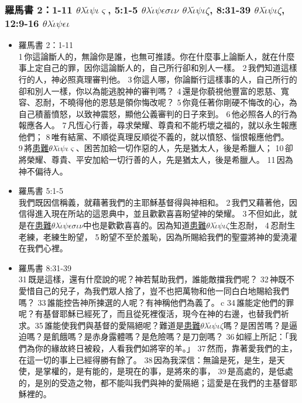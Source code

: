  \subsubsection{羅馬書 2：1-11 $\theta$$\lambda$$\widetilde{\iota}$$\psi$$\iota$$\varsigma$, 5:1-5 $\theta$$\lambda$$\acute{\iota}$$\psi$$\epsilon$$\sigma$$\iota$$\nu$ $\theta$$\lambda$$\tilde{\iota}$$\psi$$\iota$$\zeta$, 8:31-39 $\theta$$\lambda$$\tilde{\iota}$$\psi$$\iota$$\zeta$, 12:9-16 $\theta$$\lambda$$\acute{\iota}$$\psi$$\epsilon$$\iota$}
 \begin{itemize} 
\itemsep-.25em
\item{羅馬書 2：1-11}\\1 你這論斷人的，無論你是誰，也無可推諉。你在什麼事上論斷人，就在什麼事上定自己的罪，因你這論斷人的，自己所行卻和別人一樣。 2 我們知道這樣行的人，神必照真理審判他。 3 你這人哪，你論斷行這樣事的人，自己所行的卻和別人一樣，你以為能逃脫神的審判嗎？ 4 還是你藐視他豐富的恩慈、寬容、忍耐，不曉得他的恩慈是領你悔改呢？ 5 你竟任著你剛硬不悔改的心，為自己積蓄憤怒，以致神震怒，顯他公義審判的日子來到。 6 他必照各人的行為報應各人。 7 凡恆心行善，尋求榮耀、尊貴和不能朽壞之福的，就以永生報應他們； 8 唯有結黨、不順從真理反順從不義的，就以憤怒、惱恨報應他們。 9 將\underline{患難$\theta$$\lambda$$\widetilde{\iota}$$\psi$$\iota$$\varsigma$}、困苦加給一切作惡的人，先是猶太人，後是希臘人； 10 卻將榮耀、尊貴、平安加給一切行善的人，先是猶太人，後是希臘人。 11 因為神不偏待人。
\item{羅馬書 5:1-5} \\我們既因信稱義，就藉著我們的主耶穌基督得與神相和。 2 我們又藉著他，因信得進入現在所站的這恩典中，並且歡歡喜喜盼望神的榮耀。 3 不但如此，就是在\underline{患難$\theta$$\lambda$$\acute{\iota}$$\psi$$\epsilon$$\sigma$$\iota$$\nu$}中也是歡歡喜喜的。因為知道\underline{患難$\theta$$\lambda$$\tilde{\iota}$$\psi$$\iota$$\zeta$}生忍耐， 4 忍耐生老練，老練生盼望， 5 盼望不至於羞恥，因為所賜給我們的聖靈將神的愛澆灌在我們心裡。  
\item{羅馬書 8:31-39}   \\ 31 既是這樣，還有什麼說的呢？神若幫助我們，誰能敵擋我們呢？ 32 神既不愛惜自己的兒子，為我們眾人捨了，豈不也把萬物和他一同白白地賜給我們嗎？ 33 誰能控告神所揀選的人呢？有神稱他們為義了。 c 34 誰能定他們的罪呢？有基督耶穌已經死了，而且從死裡復活，現今在神的右邊，也替我們祈求。35 誰能使我們與基督的愛隔絕呢？難道是\underline{患難$\theta$$\lambda$$\tilde{\iota}$$\psi$$\iota$$\zeta$}嗎？是困苦嗎？是逼迫嗎？是飢餓嗎？是赤身露體嗎？是危險嗎？是刀劍嗎？ 36 如經上所記：「我們為你的緣故終日被殺，人看我們如將宰的羊。」 37 然而，靠著愛我們的主，在這一切的事上已經得勝有餘了。 38 因為我深信：無論是死，是生，是天使，是掌權的，是有能的，是現在的事，是將來的事， 39 是高處的，是低處的，是別的受造之物，都不能叫我們與神的愛隔絕；這愛是在我們的主基督耶穌裡的。 

\end{itemize}
